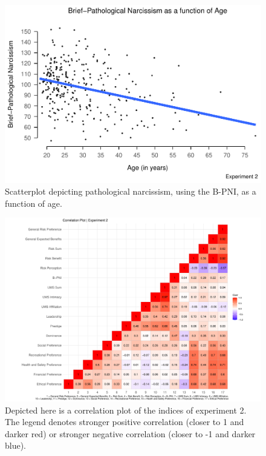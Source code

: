 \documentclass[
  donotrepeattitle,doc, 12pt, a4paper,floatsintext]{apa7}
\begin{document}
\begin{figure}
\centering
\includegraphics{Output_Files/DoPL-Experiment_files/figure-latex/Experiment-2-PNI-distribution-1.pdf}
\caption{\label{fig:Experiment-2-PNI-distribution}Scatterplot depicting pathological narcissism, using the B-PNI, as a function of age.}
\end{figure}

\newpage

\begin{landscape}

\begin{figure}

{\centering \includegraphics{Output_Files/DoPL-Experiment_files/figure-latex/unnamed-chunk-5-1} 

}

\caption{Depicted here is a correlation plot of the indices of experiment 2. The legend denotes stronger positive correlation (closer to 1 and darker red) or stronger negative correlation (closer to -1 and darker blue).}\label{fig:unnamed-chunk-5}
\end{figure}

\end{landscape}
\end{document}
